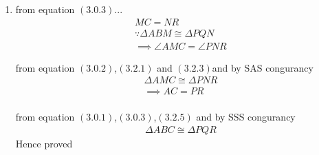 \begin{enumerate}[label=\thesection.\arabic*.,ref=\thesection.\theenumi]
	
\item
from equation $\left(3.0.3\right)$...
\begin{align}
MC = NR
\\
\because \Delta ABM \cong \Delta PQN 
\\
\implies \angle AMC = \angle PNR
\end{align}


from equation $\left(3.0.2\right)$,$\left(3.2.1\right)$ and $\left(3.2.3\right)$and by SAS congurancy 
\begin{align}
\Delta AMC \cong \Delta PNR
\\
\implies AC = PR
\end{align}
\\
	from equation $\left(3.0.1\right)$,$\left(3.0.3\right)$,$\left(3.2.5\right)$ and  by SSS congurancy
\begin{align}
\Delta ABC \cong \Delta PQR
\end{align}
\centering Hence proved

\end{enumerate}
